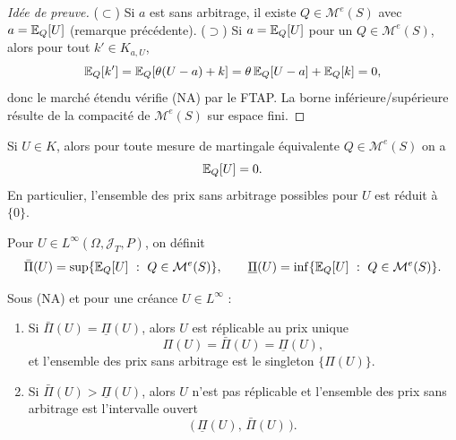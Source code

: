 \begin{proof}[Idée de preuve]
($\subset$) Si $a$ est sans arbitrage, il existe $Q\in\mathcal{M}^e(S)$ avec $a=\mathbb{E}_Q[U]$ (remarque précédente).  
($\supset$) Si $a=\mathbb{E}_Q[U]$ pour un $Q\in\mathcal{M}^e(S)$, alors pour tout $k'\in K_{a,U}$,
\[
\mathbb{E}_Q[k'] = \mathbb{E}_Q[\theta(U-a)+k]= \theta\,\mathbb{E}_Q[U-a]+\mathbb{E}_Q[k]=0,
\]
donc le marché étendu vérifie (NA) par le FTAP.  
La borne inférieure/supérieure résulte de la compacité de $\mathcal{M}^e(S)$ sur espace fini.
\end{proof}



\begin{remarque}\label{rq:UinK_implique_0}
Si $U\in K$, alors pour toute mesure de martingale équivalente $Q\in\mathcal{M}^e(S)$ on a
\[
\mathbb{E}_Q[U]=0.
\]
En particulier, l'ensemble des prix sans arbitrage possibles pour $U$ est réduit à $\{0\}$.
\end{remarque}

\begin{definition}
Pour $U\in L^\infty(\Omega,\mathcal{J}_T,P)$, on définit
\begin{equation}
\bar\Pi(U)=\sup\{\E_Q[U]\ :\ Q\in\mathcal{M}^e(S)\}, \qquad
\underline{\Pi}(U)=\inf\{\E_Q[U]\ :\ Q\in\mathcal{M}^e(S)\}.
\end{equation}
\end{definition}

\begin{lemme}\label{lem:replicabilite_intervalle_prix}
Sous (NA) et pour une créance $U\in L^\infty$ :
\begin{enumerate}
\item[(a)] Si $\bar\Pi(U)=\underline{\Pi}(U)$, alors $U$ est réplicable au prix unique
\[
\Pi(U)=\bar\Pi(U)=\underline{\Pi}(U),
\]
et l'ensemble des prix sans arbitrage est le singleton $\{\Pi(U)\}$.
\item[(b)] Si $\bar\Pi(U)>\underline{\Pi}(U)$, alors $U$ n'est pas réplicable et
l'ensemble des prix sans arbitrage est l'intervalle ouvert
\[
\big(\,\underline{\Pi}(U),\,\bar\Pi(U)\,\big).
\]
\end{enumerate}
\end{lemme}

